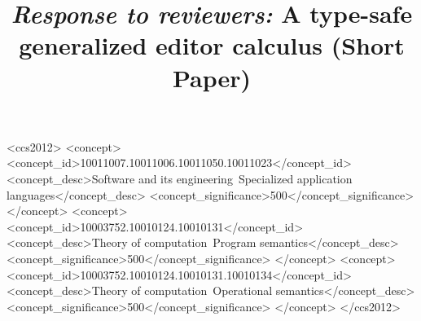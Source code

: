 \documentclass[anonymous,review]{acmart}
\begin{document}
\title{\emph{Response to reviewers:} A type-safe generalized editor calculus (Short Paper)}













\renewcommand{\shortauthors}{AAU Bachelor}


\begin{CCSXML}
<ccs2012>
   <concept>
       <concept_id>10011007.10011006.10011050.10011023</concept_id>
       <concept_desc>Software and its engineering~Specialized application languages</concept_desc>
       <concept_significance>500</concept_significance>
       </concept>
   <concept>
       <concept_id>10003752.10010124.10010131</concept_id>
       <concept_desc>Theory of computation~Program semantics</concept_desc>
       <concept_significance>500</concept_significance>
       </concept>
   <concept>
       <concept_id>10003752.10010124.10010131.10010134</concept_id>
       <concept_desc>Theory of computation~Operational semantics</concept_desc>
       <concept_significance>500</concept_significance>
       </concept>
 </ccs2012>
\end{CCSXML}
\end{document}
